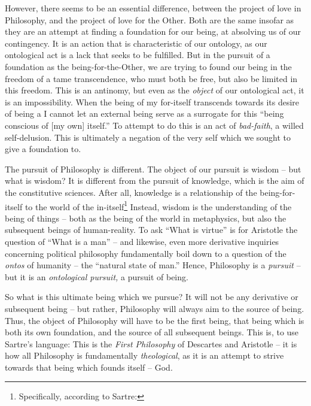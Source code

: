 However, there seems to be an essential difference, between the project of love in Philosophy, and the project of love for the Other. Both are the same insofar as they are an attempt at finding a foundation for our being, at absolving us of our contingency. It is an action that is characteristic of our ontology, as our ontological act is a lack that seeks to be fulfilled. But in the pursuit of a foundation as the being-for-the-Other, we are trying to found our being in the freedom of a tame transcendence, who must both be free, but also be limited in this freedom. This is an antinomy, but even as the \emph{object} of our ontological act, it is an impossibility. When the being of my for-itself transcends towards its desire of being a  I cannot let an external being serve as a surrogate for this \enquote{being conscious of [my own] itself.} 
To attempt to do this is an act of \emph{bad-faith}, a willed self-delusion. This is ultimately a negation of the very self which we sought to give a foundation to.  

The pursuit of Philosophy is different. The object of our pursuit is wisdom -- but what is wisdom? It is different from the pursuit of knowledge, which is the aim of the constitutive sciences. After all, knowledge is a relationship of the being-for-itself to the world of the in-itself\footnote{Specifically,  according to Sartre: } Instead, wisdom is the understanding of the being of things -- both as the being of the world in metaphysics, but also the subsequent beings of human-reality. To ask \enquote{What is virtue} is for Aristotle the question of \enquote{What is a man} -- and likewise, even more derivative inquiries concerning political philosophy fundamentally boil down to a question of the \emph{ontos} of humanity -- the \enquote{natural state of man.} Hence, Philosophy is a \emph{pursuit} -- but it is an \emph{ontological pursuit,} a pursuit of being.


So what is this ultimate being which we pursue? It will not be any derivative or subsequent being -- but rather, Philosophy will always aim to the source of being. Thus, the object of Philosophy will have to be the first being, that being which is both its own foundation, and the source of all subsequent beings. This is, to use Sartre's language:  This is the \emph{First Philosophy} of Descartes and Aristotle -- it is how all Philosophy is fundamentally \emph{theological}, as it is an attempt to strive towards that being which founds itself -- God.

